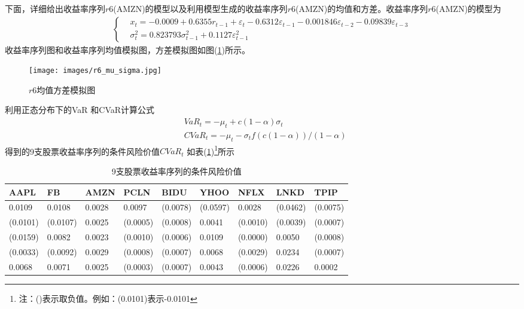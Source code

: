         下面，详细给出收益率序列$r6$(AMZN)的模型以及利用模型生成的收益率序列$r6$(AMZN)的均值和方差。收益率序列$r6$(AMZN)的模型为
        \begin{align*}
        \left\{
        \begin{aligned}
        & x_t = -0.0009+0.6355r_{t-1}+\varepsilon_t-0.6312\varepsilon_{t-1}-0.001846\varepsilon_{t-2}-0.09839\varepsilon_{t-3}\\
        & \sigma_t^2 = 0.823793\sigma_{t-1}^2+0.1127\varepsilon_{t-1}^2
        \end{aligned}
        \right.
        \end{align*}
        收益率序列图和收益率序列均值模拟图，方差模拟图如图(\ref{r6均值方差模拟图})所示。
        \begin{figure}[H]
        \centering
        \texttt{[image: images/r6\_mu\_sigma.jpg]}
        \caption{$r6$均值方差模拟图}
        \label{r6均值方差模拟图}
        \end{figure}
        \par
        利用正态分布下的VaR 和CVaR计算公式
        \begin{align*}
        & VaR_t = -\mu_t + c(1-\alpha)\sigma_t\\
        & CVaR_t = -\mu_t-\sigma_tf(c(1-\alpha))/(1-\alpha)
        \end{align*}
        得到的9支股票收益率序列的条件风险价值$CVaR_t$ 如表(\ref{9支股票收益率序列的条件风险价值})\footnote{注：()表示取负值。例如：(0.0101)表示-0.0101}所示
        \begin{table}[H]
        \footnotesize
        \caption{9支股票收益率序列的条件风险价值}
        \label{9支股票收益率序列的条件风险价值}
        \centering
        \begin{tabular}{lllllllll}
            \toprule
        AAPL      &   FB       &  AMZN   & PCLN     & BIDU     & YHOO     & NFLX     & LNKD     & TPIP\\
                    \midrule
        0.0109    &   0.0108   &  0.0028 & 0.0097   & (0.0078) & (0.0597) & 0.0028   & (0.0462) & (0.0075)\\
        (0.0101)  &   (0.0107) &  0.0025 & (0.0005) & (0.0008) & 0.0041   & (0.0010) & (0.0039) & (0.0007)\\
        (0.0159)  &   0.0082   &  0.0023 & (0.0010) & (0.0006) & 0.0109   & (0.0000) & 0.0050   & (0.0008)\\
        (0.0033)  &   (0.0092) &  0.0029 & (0.0008) & (0.0007) & 0.0068   & (0.0029) & 0.0234   & (0.0007)\\
        0.0068    &   0.0071   &  0.0025 & (0.0003) & (0.0007) & 0.0043   & (0.0006) & 0.0226   &  0.0002 \\
            \bottomrule
        \end{tabular}
        \end{table}
